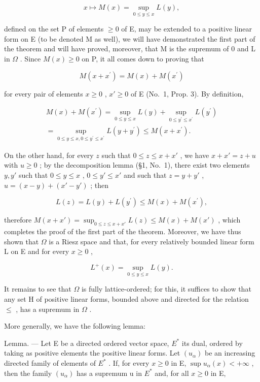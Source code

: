 \[
x \mapsto M (x) = \sup _ {0 \leqslant y \leqslant x} L (y),
\]

defined on the set P of elements \(\geqslant0\) of E, may be extended to a positive linear form on E (to be denoted M as well), we will have demonstrated the first part of the theorem and will have proved, moreover, that M is the supremum of 0 and L in \(\Omega\) . Since \(M(x)\geqslant0\) on P, it all comes down to proving that

\[
M (x + x ^ {\prime}) = M (x) + M (x ^ {\prime})
\]

for every pair of elements \(x \geqslant 0\) , \(x' \geqslant 0\) of E (No.~1, Prop. 3). By definition,

\[
\begin{array}{c} M (x) + M (x ^ {\prime}) = \sup _ {0 \leqslant y \leqslant x} L (y) + \sup _ {0 \leqslant y ^ {\prime} \leqslant x ^ {\prime}} L (y ^ {\prime}) \\ = \sup _ {0 \leqslant y \leqslant x, 0 \leqslant y ^ {\prime} \leqslant x ^ {\prime}} L (y + y ^ {\prime}) \leqslant M (x + x ^ {\prime}). \end{array}
\]

On the other hand, for every \(z\) such that \(0 \leqslant z \leqslant x + x'\) , we have \(x + x' = z + u\) with \(u \geqslant 0\) ; by the decomposition lemma (§1, No.~1), there exist two elements \(y, y'\) such that \(0 \leqslant y \leqslant x\) , \(0 \leqslant y' \leqslant x'\) and such that \(z = y + y'\) , \(u = (x - y) + (x' - y')\) ; then

\[
L (z) = L (y) + L \left(y ^ {\prime}\right) \leqslant M (x) + M \left(x ^ {\prime}\right),
\]

therefore \(M(x + x') = \sup_{0 \leqslant z \leqslant x + x'} L(z) \leqslant M(x) + M(x')\) , which completes the proof of the first part of the theorem. Moreover, we have thus shown that \(\Omega\) is a Riesz space and that, for every relatively bounded linear form L on E and for every \(x \geqslant 0\) ,

\[
L ^ {+} (x) = \sup _ {0 \leqslant y \leqslant x} L (y).\tag{1}
\]

It remains to see that \(\Omega\) is fully lattice-ordered; for this, it suffices to show that any set H of positive linear forms, bounded above and directed for the relation \(\leqslant\) , has a supremum in \(\Omega\) .

More generally, we have the following lemma:

Lemma. --- Let E be a directed ordered vector space, \(E^{*}\) its dual, ordered by taking as positive elements the positive linear forms. Let \((u_{\alpha})\) be an increasing directed family of elements of \(E^{*}\) . If, for every \(x \geqslant 0\) in E, \(\sup u_{\alpha}(x) < +\infty\) , then the family \((u_{\alpha})\) has a supremum u in \(E^{*}\) and, for all \(x \geqslant 0\) in E,


